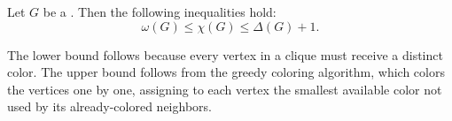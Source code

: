 \begin{proposition} \label{proposition:chromatic_number_bounds_clique_number_and_is_bounded_by_maximum_degree_plus_one}
Let $G$ be a . Then the following inequalities hold:
$$\omega(G) \leq \chi(G) \leq \Delta(G) + 1.$$

The lower bound follows because every vertex in a clique must receive a distinct color. The upper bound follows from the greedy coloring algorithm, which colors the vertices one by one, assigning to each vertex the smallest available color not used by its already-colored neighbors.
\end{proposition}
